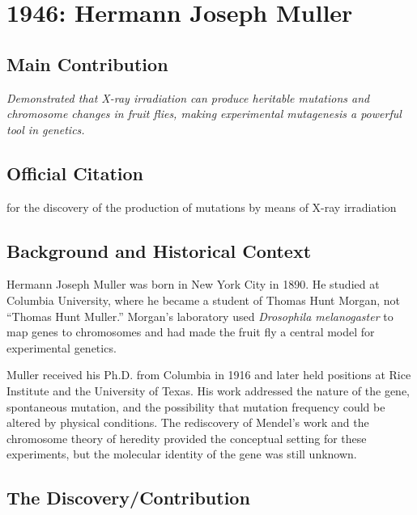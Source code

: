 \chapter[1946 --- Muller]{1946: Hermann Joseph Muller}
\label{ch:1946_hermannjosephmuller}

\section*{Main Contribution}

\textit{Demonstrated that X-ray irradiation can produce heritable mutations and chromosome changes in fruit flies, making experimental mutagenesis a powerful tool in genetics.}\cite{nobel-1946,lecture-1946}

\section{Official Citation}

for the discovery of the production of mutations by means of X-ray irradiation

\section{Background and Historical Context}

Hermann Joseph Muller was born in New York City in 1890. He studied at Columbia University, where he became a student of Thomas Hunt Morgan, not ``Thomas Hunt Muller.'' Morgan's laboratory used \textit{Drosophila melanogaster} to map genes to chromosomes and had made the fruit fly a central model for experimental genetics.

Muller received his Ph.D. from Columbia in 1916 and later held positions at Rice Institute and the University of Texas. His work addressed the nature of the gene, spontaneous mutation, and the possibility that mutation frequency could be altered by physical conditions. The rediscovery of Mendel's work and the chromosome theory of heredity provided the conceptual setting for these experiments, but the molecular identity of the gene was still unknown.

\section{The Discovery/Contribution}

